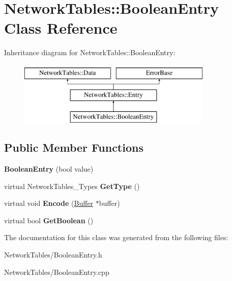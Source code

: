 \hypertarget{classNetworkTables_1_1BooleanEntry}{
\section{NetworkTables::BooleanEntry Class Reference}
\label{classNetworkTables_1_1BooleanEntry}
}
Inheritance diagram for NetworkTables::BooleanEntry:\begin{figure}[H]
\begin{center}
\leavevmode
\includegraphics[height=3.000000cm]{classNetworkTables_1_1BooleanEntry}
\end{center}
\end{figure}
\subsection*{Public Member Functions}
\begin{DoxyCompactItemize}
\item 
\hypertarget{classNetworkTables_1_1BooleanEntry_a85896c0df24f1f51be24885fea26adf4}{
{\bfseries BooleanEntry} (bool value)}
\label{classNetworkTables_1_1BooleanEntry_a85896c0df24f1f51be24885fea26adf4}

\item 
\hypertarget{classNetworkTables_1_1BooleanEntry_a41dae33587ad0c27a321e38868e460b7}{
virtual NetworkTables\_\-Types {\bfseries GetType} ()}
\label{classNetworkTables_1_1BooleanEntry_a41dae33587ad0c27a321e38868e460b7}

\item 
\hypertarget{classNetworkTables_1_1BooleanEntry_af3de31f9fe87ddca61b693a37fd84f66}{
virtual void {\bfseries Encode} (\hyperlink{classNetworkTables_1_1Buffer}{Buffer} $\ast$buffer)}
\label{classNetworkTables_1_1BooleanEntry_af3de31f9fe87ddca61b693a37fd84f66}

\item 
\hypertarget{classNetworkTables_1_1BooleanEntry_ab6c383e319124b98e65bca722557daea}{
virtual bool {\bfseries GetBoolean} ()}
\label{classNetworkTables_1_1BooleanEntry_ab6c383e319124b98e65bca722557daea}

\end{DoxyCompactItemize}


The documentation for this class was generated from the following files:\begin{DoxyCompactItemize}
\item 
NetworkTables/BooleanEntry.h\item 
NetworkTables/BooleanEntry.cpp\end{DoxyCompactItemize}
